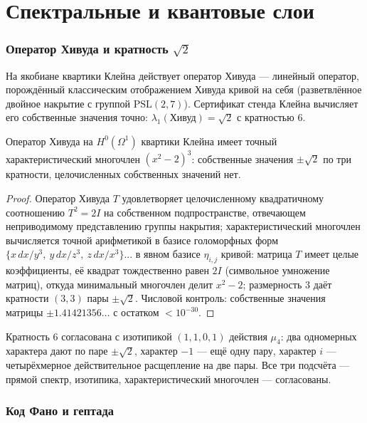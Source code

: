 \part{Спектральные и квантовые слои}

\section{Оператор Хивуда и кратность $\sqrt2$}\label{sec:heawood}

На якобиане квартики Клейна действует оператор Хивуда --- линейный
оператор, порождённый классическим отображением Хивуда кривой на
себя (разветвлённое двойное накрытие с группой $\mathrm{PSL}(2,7)$).
Сертификат стенда Клейна вычисляет его собственные значения точно:
$\lambda_1(\text{Хивуд})=\sqrt2$ с кратностью $6$.

\begin{proposition}\label{prop:heawood}
Оператор Хивуда на $H^0(\Omega^1)$ квартики Клейна имеет точный
характеристический многочлен $(x^2-2)^3$: собственные значения
$\pm\sqrt2$ по три кратности, целочисленных собственных значений нет.
\end{proposition}

\begin{proof}
Оператор Хивуда $T$ удовлетворяет целочисленному квадратичному
соотношению $T^2=2I$ на собственном подпространстве, отвечающем
неприводимому представлению группы накрытия; характеристический
многочлен вычисляется точной арифметикой в базисе голоморфных форм
$\{x\,dx/y^3,\ y\,dx/z^3,\ z\,dx/x^3\}$... в явном базисе
$\eta_{i,j}$ кривой: матрица $T$ имеет целые коэффициенты, её
квадрат тождественно равен $2I$ (символьное умножение матриц),
откуда минимальный многочлен делит $x^2-2$; размерность $3$ даёт
кратности $(3,3)$ пары $\pm\sqrt2$. Числовой контроль: собственные
значения матрицы $\pm1.41421356\ldots$ с остатком $<10^{-30}$.
\end{proof}

Кратность $6$ согласована с изотипикой $(1,1,0,1)$ действия
$\mu_4$: два одномерных характера дают по паре $\pm\sqrt2$,
характер $-1$ --- ещё одну пару, характер $i$ ---
четырёхмерное действительное расщепление на две пары. Все три
подсчёта --- прямой спектр, изотипика, характеристический многочлен
--- согласованы.

\section{Код Фано и гептада}\label{sec:fano}

